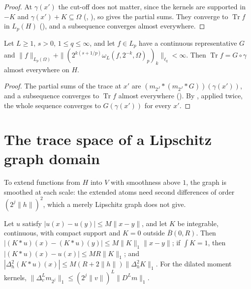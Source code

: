 \begin{proof}
\leanok
At $\gamma(x')$ the cut-off does not matter, since the kernels are supported in $-K$ and
$\gamma(x') + K \subseteq \Omega$ (, ), so
 gives the partial sums. They converge to $\operatorname{Tr} f$ in
$L_p(H)$ (), and a subsequence converges almost everywhere.
\end{proof}

\begin{theorem}
\label{thm:trace-continuous}
\leanok
{}
Let $L \geq 1$, $s > 0$, $1 \leq q \leq \infty$, and let $f \in L_p$ have a continuous
representative $G$ and
$\|f\|_{L_p(\Omega)} + \|(2^{k(s + 1/p)} \omega_L(f, 2^{-k}, \Omega)_p)_k\|_{\ell_q} < \infty$.
Then $\operatorname{Tr} f = G \circ \gamma$ almost everywhere on $H$.
\end{theorem}

\begin{proof}
\leanok
The partial sums of the trace at $x'$ are $(m_{2^J} * (m_{2^J} * G))(\gamma(x'))$, and a subsequence
converges to $\operatorname{Tr} f$ almost everywhere (). By
, applied twice, the whole sequence converges to $G(\gamma(x'))$
for every $x'$.
\end{proof}

\section{The trace space of a Lipschitz graph domain}

To extend functions from $H$ into $V$ with smoothness above $1$, the graph is smoothed at each
scale: the extended atoms need second differences of order $(2^j \|h\|)^2$, which a merely
Lipschitz graph does not give.

\begin{lemma}
\label{lem:conv-lipschitz}
\leanok
{}
Let $u$ satisfy $|u(x) - u(y)| \leq M \|x - y\|$, and let $K$ be integrable, continuous, with
compact support and $K = 0$ outside $\overline{B}(0, R)$. Then
$|(K * u)(x) - (K * u)(y)| \leq M \|K\|_1 \|x - y\|$; if $\int K = 1$, then
$|(K * u)(x) - u(x)| \leq M R \|K\|_1$; and
$|\Delta_h^2 (K * u)(x)| \leq M (R + 2\|h\|) \|\Delta_h^2 K\|_1$. For the dilated moment kernels,
$\|\Delta_v^L m_{2^j}\|_1 \leq (2^j \|v\|)^L \|D^L m\|_1$.
\end{lemma}

